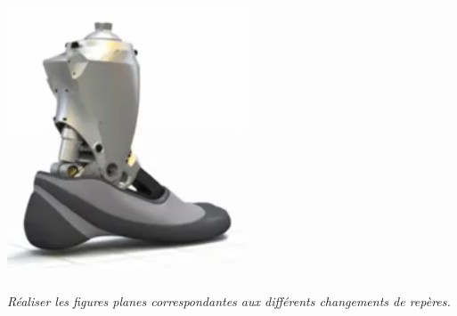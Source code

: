 \documentclass[10pt,fleqn]{article} %
\begin{document}
\begin{minipage}[c]{.49\linewidth}
\begin{center}
\includegraphics[width=.95\textwidth]{images/prot_01}
\end{center}
\end{minipage}
\fi

%
%
%

\subparagraph{}
\textit{Réaliser les figures planes correspondantes aux différents changements de repères.} 
\end{document}
